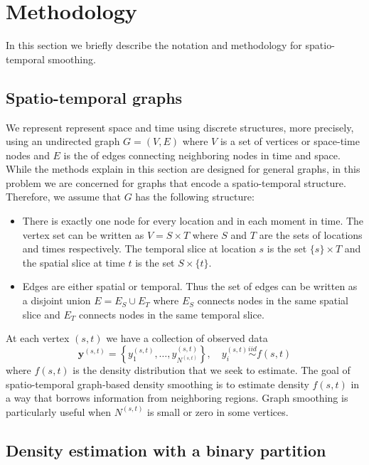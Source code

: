 \documentclass[a4paper, 11pt]{article}
\begin{document}
\section{Methodology}
\label{section:methodology}

In this section we briefly describe the notation and methodology for spatio-temporal smoothing.

\subsection{Spatio-temporal graphs}

We represent represent space and time using discrete structures, more precisely, using an undirected graph $G=(V, E)$ where $V$ is a set of vertices or space-time nodes and $E$ is the of edges connecting neighboring nodes in time and space. While the methods explain in this section are designed for general graphs, in this problem we are concerned for graphs that encode a spatio-temporal structure. Therefore, we assume that $G$ has the following structure:
\begin{itemize}[partopsep=0pt, itemsep=0pt]
    \item There is exactly one node for every location and in each moment in time. The vertex set can be written as $V = S \times T$ where $S$ and $T$ are the sets of locations and times respectively. The temporal slice at location $s$ is the set $\{s\} \times T$ and the spatial slice at time $t$ is the set $S \times \{t\}$.
    \item Edges are either spatial or temporal. Thus the set of edges can be written as a disjoint union $E = E_S \cup E_T$ where $E_S$ connects nodes in the same spatial slice and $E_T$ connects nodes in the same temporal slice.
\end{itemize}
 At each vertex $(s,t)$ we have a collection of observed data $$\textbf{y}^{(s,t)}=\left\{y^{(s,t)}_1,\hdots,y^{(s,t)}_{N^{(s,t)}}\right\},
 \quad y^{(s,t)}_i \overset{iid}{\sim} f(s,t)$$
 where $f(s,t)$ is the density distribution that we seek to estimate. The goal of spatio-temporal graph-based density smoothing is to estimate density $f(s,t)$ in a way that borrows information from neighboring regions. Graph smoothing is particularly useful when $N^{(s,t)}$ is small or zero in some vertices. 

\subsection{Density estimation with a binary partition}
\label{sec:binary-patition}
\end{document}
